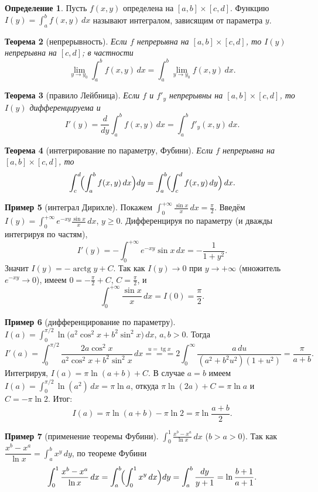 \documentclass[11pt,a4paper]{article}
\theoremstyle{definition}
\newtheorem{definition}{Определение}[section]
\newtheorem{example}[definition]{Пример}
\theoremstyle{plain}
\newtheorem{theorem}[definition]{Теорема}
\DeclareMathOperator{\tg}{tg}
\DeclareMathOperator{\arctg}{arctg}
\newcommand{\dx}{\,dx}
\renewcommand{\ge}{\geqslant}
\begin{document}
\begin{definition}
Пусть $f(x,y)$ определена на $[a,b]\times[c,d]$. Функцию
$\displaystyle I(y)=\int_a^b f(x,y)\dx$ называют интегралом, зависящим от параметра $y$.
\end{definition}

\begin{theorem}[непрерывность]
Если $f$ непрерывна на $[a,b]\times[c,d]$, то $I(y)$ непрерывна на $[c,d]$; в частности
\[
  \lim_{y\to y_0}\int_a^b f(x,y)\dx=\int_a^b\lim_{y\to y_0}f(x,y)\dx .
\]
\end{theorem}

\begin{theorem}[правило Лейбница]
Если $f$ и $f'_y$ непрерывны на $[a,b]\times[c,d]$, то $I(y)$ дифференцируема и
\[
  I'(y)=\frac{d}{dy}\int_a^b f(x,y)\dx=\int_a^b f'_y(x,y)\dx .
\]
\end{theorem}

\begin{theorem}[интегрирование по параметру, Фубини]
Если $f$ непрерывна на $[a,b]\times[c,d]$, то
\[
  \int_c^d\!\Bigl(\int_a^b f(x,y)\dx\Bigr)dy=\int_a^b\!\Bigl(\int_c^d f(x,y)\,dy\Bigr)\dx .
\]
\end{theorem}

\begin{example}[интеграл Дирихле]
Покажем $\displaystyle\int_0^{+\infty}\frac{\sin x}{x}\dx=\frac\pi2$. Введём
$\displaystyle I(y)=\int_0^{+\infty}e^{-xy}\frac{\sin x}{x}\dx$, $y\ge0$. Дифференцируя по
параметру (и дважды интегрируя по частям),
\[
  I'(y)=-\int_0^{+\infty}e^{-xy}\sin x\dx=-\frac{1}{1+y^2}.
\]
Значит $I(y)=-\arctg y+C$. Так как $I(y)\to0$ при $y\to+\infty$ (множитель $e^{-xy}\to0$), имеем
$0=-\frac\pi2+C$, $C=\frac\pi2$, и
\[
  \int_0^{+\infty}\frac{\sin x}{x}\dx=I(0)=\frac\pi2 .
\]
\end{example}

\begin{example}[дифференцирование по параметру]
$\displaystyle I(a)=\int_0^{\pi/2}\ln\bigl(a^2\cos^2x+b^2\sin^2x\bigr)\dx$, $a,b>0$. Тогда
\[
  I'(a)=\int_0^{\pi/2}\frac{2a\cos^2x}{a^2\cos^2x+b^2\sin^2x}\dx
   \overset{u=\tg x}{=\!=\!=}2\int_0^{\infty}\frac{a\,du}{(a^2+b^2u^2)(1+u^2)}=\frac{\pi}{a+b}.
\]
Интегрируя, $I(a)=\pi\ln(a+b)+C$. В случае $a=b$ имеем
$I(a)=\int_0^{\pi/2}\ln(a^2)\dx=\pi\ln a$, откуда $\pi\ln(2a)+C=\pi\ln a$ и $C=-\pi\ln2$. Итог:
\[
  I(a)=\pi\ln(a+b)-\pi\ln2=\pi\ln\frac{a+b}{2}.
\]
\end{example}

\begin{example}[применение теоремы Фубини]
$\displaystyle\int_0^1\frac{x^b-x^a}{\ln x}\dx$ ($b>a>0$). Так как
$\dfrac{x^b-x^a}{\ln x}=\int_a^b x^y\,dy$, по теореме Фубини
\[
  \int_0^1\frac{x^b-x^a}{\ln x}\dx=\int_a^b\!\Bigl(\int_0^1 x^y\dx\Bigr)dy
   =\int_a^b\frac{dy}{y+1}=\ln\frac{b+1}{a+1}.
\]
\end{example}
\end{document}
